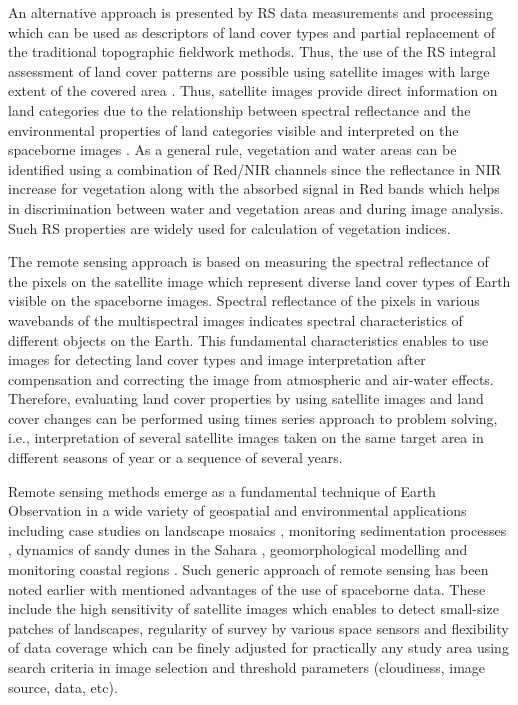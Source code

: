 \documentclass[environments,article,submit,pdftex,moreauthors]{Definitions/mdpi}
\begin{document}
An alternative approach is presented by RS data measurements and processing which can be used as descriptors of land cover types and partial replacement of the traditional topographic fieldwork methods. Thus, the use of the RS integral assessment of land cover patterns are possible using satellite images with large extent of the covered area \cite{ELGHOUL2023106733}. Thus, satellite images provide direct information on land categories due to the relationship between spectral reflectance and the environmental properties of land categories visible and interpreted on the spaceborne images \cite{Allouche,Ruiz,Ray}. As a general rule, vegetation and water areas can be identified using a combination of Red/NIR channels since the reflectance in NIR increase for vegetation along with the absorbed signal in Red bands which helps in discrimination between water and vegetation areas and during image analysis. Such RS properties are widely used for calculation of vegetation indices. 

The remote sensing approach is based on measuring the spectral reflectance of the pixels on the satellite image which represent diverse land cover types of Earth visible on the spaceborne images. Spectral reflectance of the pixels in various wavebands of the multispectral images indicates spectral characteristics of different objects on the Earth. This fundamental characteristics enables to use images for detecting land cover types and image interpretation after compensation and correcting the image from atmospheric and air-water effects. Therefore, evaluating land cover properties by using satellite images and land cover changes can be performed using times series approach to problem solving, i.e., interpretation of several satellite images taken on the same target area in different seasons of year or a sequence of several years. 

Remote sensing methods emerge as a fundamental technique of Earth Observation in a wide variety of geospatial and environmental applications including case studies on landscape mosaics \cite{BIARNES2021103281}, monitoring sedimentation processes \cite{TOWNSHEND1989177}, dynamics of sandy dunes in the Sahara \cite{Afrasinei}, geomorphological modelling \cite{Desprats} and monitoring coastal regions \cite{AMROUNI201973,Jaquet}. Such generic approach of remote sensing has been noted earlier \cite{RAMPHERI2023103359} with mentioned advantages of the use of spaceborne data. These include the high sensitivity of satellite images which enables to detect small-size patches of landscapes, regularity of survey by various space sensors and flexibility of data coverage which can be finely adjusted for practically any study area using search criteria in image selection and threshold parameters (cloudiness, image source, data, etc). 
\end{document}
